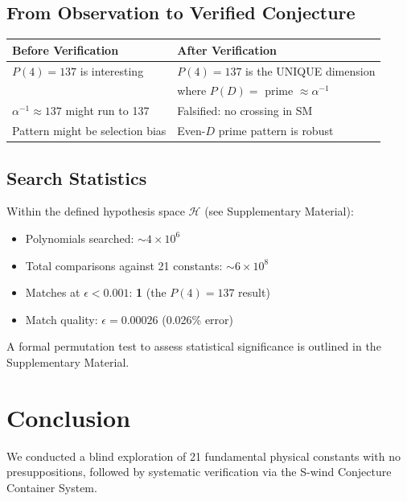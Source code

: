 \documentclass[11pt,a4paper]{article}
\begin{document}
\subsection{From Observation to Verified Conjecture}

\begin{center}
\begin{tabular}{|l|l|}
\hline
\textbf{Before Verification} & \textbf{After Verification} \\
\hline
$P(4) = 137$ is interesting & $P(4) = 137$ is the UNIQUE dimension \\
 & where $P(D) =$ prime $\approx \alpha^{-1}$ \\
\hline
$\alpha^{-1} \approx 137$ might run to 137 & Falsified: no crossing in SM \\
\hline
Pattern might be selection bias & Even-$D$ prime pattern is robust \\
\hline
\end{tabular}
\end{center}

\subsection{Search Statistics}

Within the defined hypothesis space $\mathcal{H}$ (see Supplementary Material):
\begin{itemize}
    \item Polynomials searched: $\sim 4 \times 10^6$
    \item Total comparisons against 21 constants: $\sim 6 \times 10^8$
    \item Matches at $\epsilon < 0.001$: \textbf{1} (the $P(4) = 137$ result)
    \item Match quality: $\epsilon = 0.00026$ (0.026\% error)
\end{itemize}

A formal permutation test to assess statistical significance is outlined in the Supplementary Material.

\section{Conclusion}

We conducted a blind exploration of 21 fundamental physical constants with no presuppositions, followed by systematic verification via the S-wind Conjecture Container System.
\end{document}
